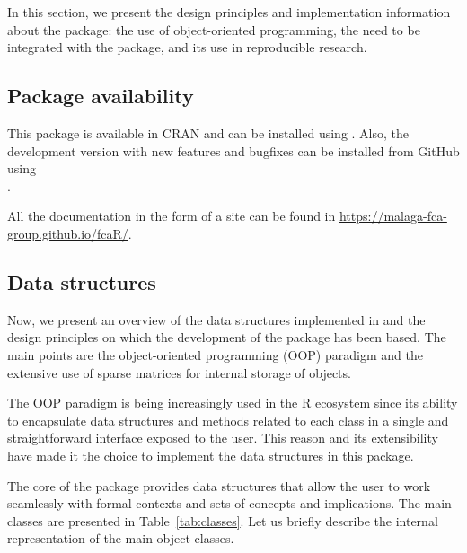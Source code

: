 In this section, we present the design principles and implementation
information about the  package: the use of object-oriented
programming, the need to be integrated with the  package,
and its use in reproducible research.

\hypertarget{package-availability}{%
\subsection{Package availability}\label{package-availability}}

This package is available in CRAN and can be installed using
. Also, the development version with new
features and bugfixes can be installed from GitHub using~\\
.

All the documentation in the form of a  site can be found
in \url{https://malaga-fca-group.github.io/fcaR/}.

\hypertarget{data-structures}{%
\subsection{Data structures}\label{data-structures}}

Now, we present an overview of the data structures implemented in
 and the design principles on which the development of the
package has been based. The main points are the  \citep{R6}
object-oriented programming (OOP) paradigm and the extensive use of
sparse matrices for internal storage of objects.

The  OOP paradigm is being increasingly used in the R ecosystem
since its ability to encapsulate data structures and methods related to
each class in a single and straightforward interface exposed to the
user. This reason and its extensibility have made it the choice to
implement the data structures in this package.

The core of the  package provides data structures that allow
the user to work seamlessly with formal contexts and sets of concepts
and implications. The main classes are presented in
Table~\ref{tab:classes}. Let us briefly describe the internal
representation of the main object classes.

